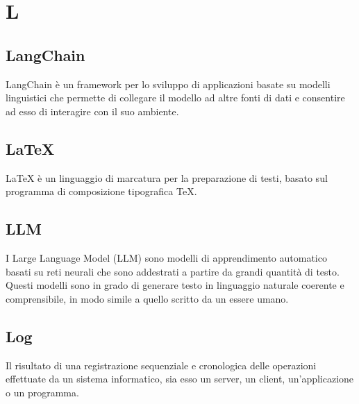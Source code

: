 \chapter{L}

\section{LangChain}
LangChain è un framework per lo sviluppo di applicazioni basate su modelli linguistici che permette di collegare il modello ad altre fonti di dati e consentire ad esso di interagire con il suo ambiente.

\section{LaTeX}
LaTeX è un linguaggio di marcatura per la preparazione di testi, basato sul programma di composizione tipografica \TeX.

\section{LLM}\label{sec:Large Language Model}
I Large Language Model (LLM) sono modelli di apprendimento automatico basati su reti neurali che sono addestrati a partire da grandi quantità di testo. Questi modelli sono in grado di generare testo in linguaggio naturale coerente e comprensibile, in modo simile a quello scritto da un essere umano.

\section{Log}
Il risultato di una registrazione sequenziale e cronologica delle operazioni effettuate da un sistema informatico, sia esso un server, un client, un'applicazione o un programma.
